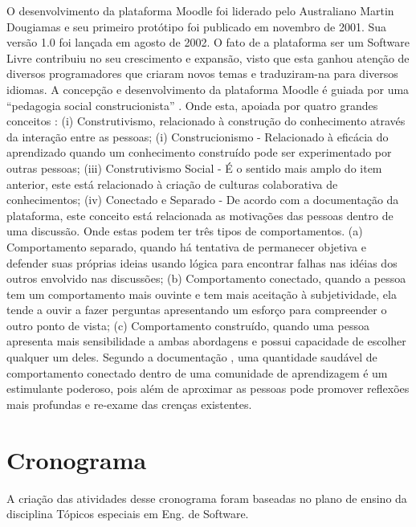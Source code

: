 O desenvolvimento da plataforma Moodle foi liderado pelo Australiano Martin  Dougiamas e seu primeiro protótipo foi publicado em novembro de 2001. Sua versão 1.0 foi lançada em agosto de 2002. O fato de a plataforma ser um Software Livre contribuiu no seu crescimento e expansão, visto que esta ganhou atenção de diversos programadores que criaram novos temas e traduziram-na para diversos idiomas.   A concepção e desenvolvimento da plataforma Moodle é guiada por uma  “pedagogia social construcionista” \cite{moodle}.
Onde esta, apoiada por quatro grandes conceitos  : (i) Construtivismo, relacionado à construção do conhecimento através da interação entre as pessoas; (i) Construcionismo - Relacionado à eficácia do aprendizado quando um conhecimento construído pode ser experimentado por outras pessoas; (iii) Construtivismo Social - É o sentido mais amplo do item anterior, este está relacionado à criação de culturas colaborativa de conhecimentos; (iv) Conectado e Separado - De acordo com a documentação da plataforma, este conceito está relacionada as motivações das pessoas dentro de uma discussão. Onde estas podem ter três tipos de comportamentos. (a) Comportamento separado, quando há tentativa de permanecer objetiva e defender suas próprias ideias usando lógica para encontrar falhas nas idéias dos outros envolvido nas discussões; (b) Comportamento conectado, quando a pessoa tem um comportamento mais ouvinte e tem mais aceitação à subjetividade, ela tende a ouvir a fazer perguntas apresentando um esforço para compreender o outro ponto de vista; (c) Comportamento construído, quando uma pessoa apresenta mais sensibilidade a ambas abordagens e possui capacidade de escolher qualquer um deles. Segundo a documentação \cite{moodle}, uma quantidade saudável de comportamento conectado dentro de uma comunidade de aprendizagem é um estimulante poderoso, pois além de aproximar as pessoas pode promover reflexões mais profundas e re-exame das crenças existentes.



\section{Cronograma}
A criação das atividades desse cronograma foram baseadas no plano de ensino da disciplina Tópicos especiais em Eng. de Software. 

